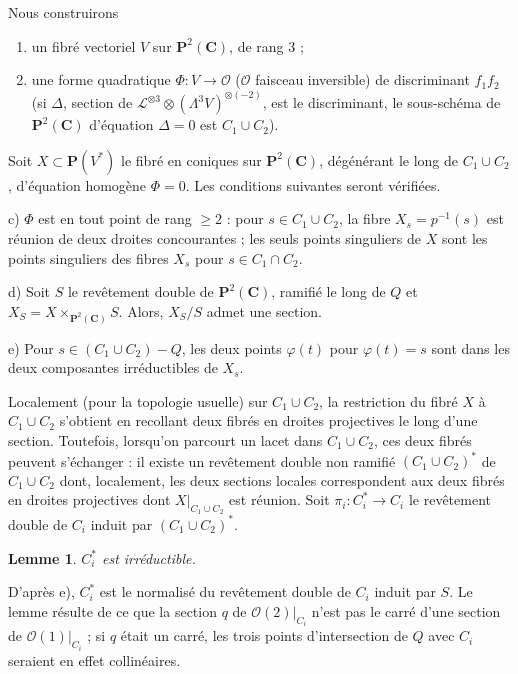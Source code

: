 \documentclass[12pt]{amsart}
\theoremstyle{plain}
\newtheorem{lemme}[theoreme]{Lemme}
\theoremstyle{definition}
\theoremstyle{remark}
\begin{document}
\medskip
Nous construirons
\begin{enumerate}
\item[a)] un fibr\'e vectoriel $V$ sur $\mathbf{P}^2(\mathbf{C})$, de rang $3$ ;
\item[b)] une forme quadratique $\Phi: V \to \mathcal{O}$ ($\mathcal{O}$ faisceau inversible) de discriminant
$f_1 f_2$ (si $\Delta$, section de $\mathcal{L}^{\otimes 3} \otimes (\Lambda^3 V)^{\otimes(-2)}$, est le discriminant, le sous-\linebreak sch\'ema de $\mathbf{P}^2(\mathbf{C})$ d'\'equation $\Delta = 0$ est $C_1 \cup C_2$).
\end{enumerate}

Soit $X \subset \mathbf{P}(V^*)$ le fibr\'e en coniques sur $\mathbf{P}^2(\mathbf{C})$, d\'eg\'en\'erant le long de
$C_1 \cup C_2$, d'\'equation homog\`ene $\Phi = 0$. Les conditions suivantes seront v\'erifi\'ees.

\medskip
c) $\Phi$ est en tout point de rang $\geqslant 2$ : pour $s \in C_1 \cup C_2$, la fibre $X_s = p^{-1}(s)$
est r\'eunion de deux droites concourantes ; les seuls points singuliers de $X$
sont les points singuliers des fibres $X_s$ pour $s \in C_1 \cap C_2$.

\medskip
d) Soit $S$ le rev\^etement double de $\mathbf{P}^2(\mathbf{C})$, ramifi\'e le long de $Q$ et
$X_S = X \times_{\mathbf{P}^2(\mathbf{C})} S$. Alors, $X_S/S$ admet une section.

\medskip
e) Pour $s \in (C_1 \cup C_2) - Q$, les deux points $\varphi(t)$ pour $\varphi(t) = s$
sont dans les deux composantes irr\'eductibles de $X_s$.

\medskip
Localement (pour la topologie usuelle) sur $C_1 \cup C_2$, la restriction du fibr\'e
$X$ \`a $C_1 \cup C_2$ s'obtient en recollant deux fibr\'es en droites projectives le long
d'une section. Toutefois, lorsqu'on parcourt un lacet dans $C_1 \cup C_2$, ces deux
fibr\'es peuvent s'\'echanger : il existe un rev\^etement double non ramifi\'e $(C_1 \cup C_2)^*$
de $C_1 \cup C_2$ dont, localement, les deux sections locales correspondent aux deux
fibr\'es en droites projectives dont $X|_{C_1 \cup C_2}$ est r\'eunion. Soit $\pi_i: C_i^* \to C_i$
le rev\^etement double de $C_i$ induit par $(C_1 \cup C_2)^*$.

\begin{lemme}\label{lem:3.1}
$C_i^*$ est irr\'eductible.
\end{lemme}

D'apr\`es e), $C_i^*$ est le normalis\'e du rev\^etement double de $C_i$ induit par $S$.
Le lemme r\'esulte de ce que la section $q$ de $\mathcal{O}(2)|_{C_i}$ n'est pas le carr\'e d'une
section de $\mathcal{O}(1)|_{C_i}$ ; si $q$ \'etait un carr\'e, les trois points d'intersection de
$Q$ avec $C_i$ seraient en effet collin\'eaires.
\end{document}
